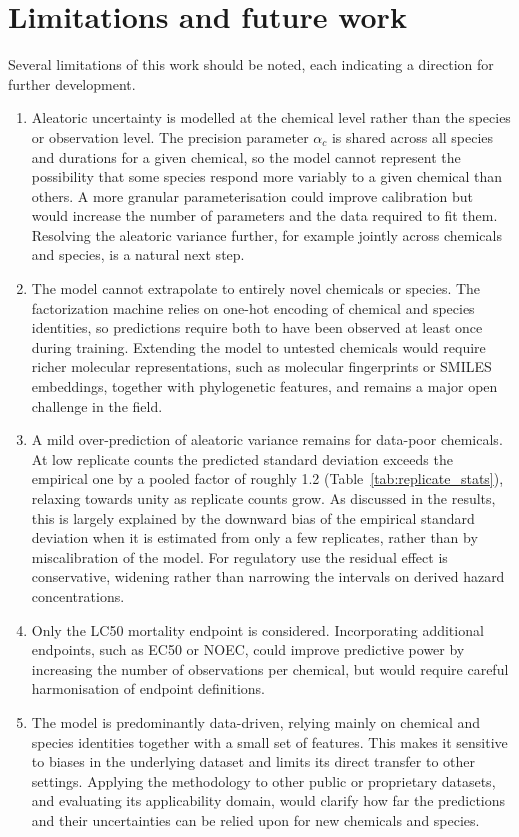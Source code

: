 \section{Limitations and future work}

Several limitations of this work should be noted, each indicating a direction for further development.

\begin{enumerate}
    \item Aleatoric uncertainty is modelled at the chemical level rather than the species or observation level. The precision parameter $\alpha_c$ is shared across all species and durations for a given chemical, so the model cannot represent the possibility that some species respond more variably to a given chemical than others. A more granular parameterisation could improve calibration but would increase the number of parameters and the data required to fit them. Resolving the aleatoric variance further, for example jointly across chemicals and species, is a natural next step.

    \item The model cannot extrapolate to entirely novel chemicals or species. The factorization machine relies on one-hot encoding of chemical and species identities, so predictions require both to have been observed at least once during training. Extending the model to untested chemicals would require richer molecular representations, such as molecular fingerprints or SMILES embeddings, together with phylogenetic features, and remains a major open challenge in the field.

    \item A mild over-prediction of aleatoric variance remains for data-poor chemicals. At low replicate counts the predicted standard deviation exceeds the empirical one by a pooled factor of roughly 1.2 (Table~\ref{tab:replicate_stats}), relaxing towards unity as replicate counts grow. As discussed in the results, this is largely explained by the downward bias of the empirical standard deviation when it is estimated from only a few replicates, rather than by miscalibration of the model. For regulatory use the residual effect is conservative, widening rather than narrowing the intervals on derived hazard concentrations.

    \item Only the LC50 mortality endpoint is considered. Incorporating additional endpoints, such as EC50 or NOEC, could improve predictive power by increasing the number of observations per chemical, but would require careful harmonisation of endpoint definitions.

    \item The model is predominantly data-driven, relying mainly on chemical and species identities together with a small set of features. This makes it sensitive to biases in the underlying dataset and limits its direct transfer to other settings. Applying the methodology to other public or proprietary datasets, and evaluating its applicability domain, would clarify how far the predictions and their uncertainties can be relied upon for new chemicals and species.
\end{enumerate}